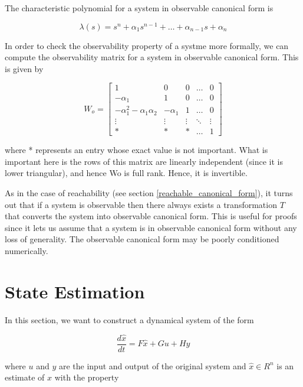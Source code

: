 The characteristic polynomial for a system in observable canonical form is

\begin{equation}
\lambda(s) = s^n +\alpha_1s^{n-1} + \ldots + \alpha_{n-1}s + \alpha_n
\end{equation}

In order to check the observability property of a systme more formally, we can compute the observability matrix for
a system in observable canonical form. This is given by

\begin{equation}
W_o= 
\begin{bmatrix}
 1 & 0 & 0 & \ldots &  0\\
 -\alpha_1 & 1 & 0 & \ldots &  0 \\
 -\alpha_{1}^{2} - \alpha_1 \alpha_2 & - \alpha_1 & 1 &  \ldots &  0 \\
 \vdots & \vdots & \vdots & \ddots & \vdots \\
* & * & * & \ldots & 1
\end{bmatrix} 
\end{equation}


where * represents  an entry  whose exact  value  is  not important.
What is important here is the rows of this matrix are linearly independent (since it is lower triangular), and hence Wo is full rank. Hence, it is invertible. 

As in the case of reachability (see section \ref{reachable_canonical_form}), it  turns  out  that  if a  system  is  observable then there
always exists a transformation $T$ that converts the system into observable canonical
form. This is useful for proofs since it lets us assume that a system is in observable
canonical form without any loss of generality. The observable canonical form may
be poorly conditioned numerically.
 

\section{State Estimation}

In this section, we want to construct a dynamical system of the form

\begin{equation}
\frac{d \hat{x}}{dt} = F\hat{x} + Gu + Hy  
\end{equation}

where $u$ and $y$ are the input and output of the original system and $\hat{x} \in R^n$ is an estimate of $x$ with the property

